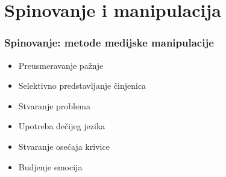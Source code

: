 \documentclass{beamer}
\begin{document}
\section{Spinovanje i manipulacija}

\begin{frame}[fragile]\frametitle{Spinovanje: metode medijske manipulacije}
	\begin{itemize}	
		\item Preusmeravanje pažnje
		\item Selektivno predstavljanje činjenica
		\item Stvaranje problema
  	\item Upotreba dečijeg jezika
		\item Stvaranje osećaja krivice
		\item Budjenje emocija
	\end{itemize}
\end{frame}
\end{document}

